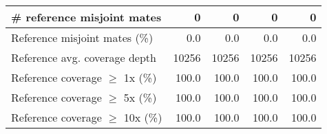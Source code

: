 \documentclass[12pt,a4paper]{article}
\begin{document}
\begin{table}[ht]
\begin{center}
\begin{tabular}{|l*{4}{|r}|}
\# reference misjoint mates & 0 & 0 & 0 & 0 \\ \hline
Reference misjoint mates (\%) & 0.0 & 0.0 & 0.0 & 0.0 \\ \hline
Reference avg. coverage depth & 10256 & 10256 & 10256 & 10256 \\ \hline
Reference coverage $\geq$ 1x (\%) & 100.0 & 100.0 & 100.0 & 100.0 \\ \hline
Reference coverage $\geq$ 5x (\%) & 100.0 & 100.0 & 100.0 & 100.0 \\ \hline
Reference coverage $\geq$ 10x (\%) & 100.0 & 100.0 & 100.0 & 100.0 \\ \hline
\end{tabular}
\end{center}
\end{table}
\end{document}
